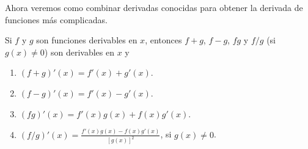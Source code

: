 \documentclass[12pt,a4paper]{book}
\begin{document}
    Ahora veremos como combinar derivadas conocidas para obtener la derivada
    de funciones más complicadas.

    \begin{proposicion}\label{prop:60}
        Si $f$ y $g$ son funciones derivables
        en $x$, entonces $f+g$, $f-g$, $fg$ y $f/g$ (si $g(x)\neq 0$) son derivables en $x$ y
        \begin{enumerate}[nosep]
            \item $(f+g)'(x)=f'(x)+g'(x)$.
            \item $(f-g)'(x)=f'(x)-g'(x)$.
            \item $(fg)'(x)=f'(x)g(x)+f(x)g'(x)$.
            \item $(f/g)'(x)=\frac{f'(x)g(x)-f(x)g'(x)}{[g(x)]^{2}}$, si $g(x)\neq 0$.
        \end{enumerate}
    \end{proposicion}
\end{document}
